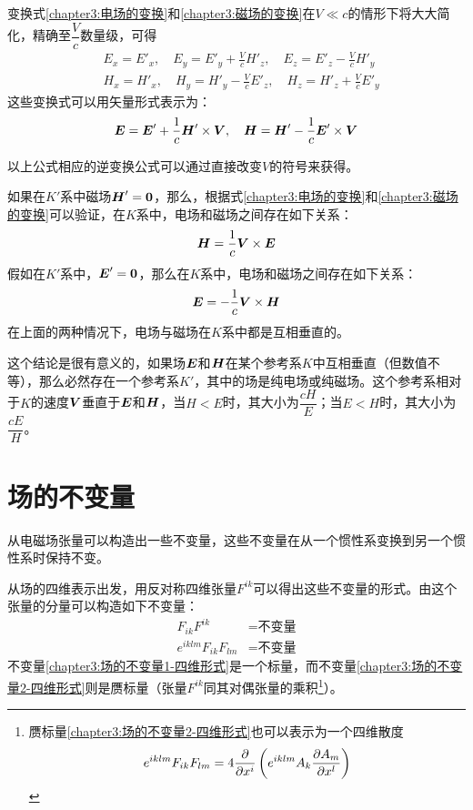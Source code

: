变换式\eqref{chapter3:电场的变换}和\eqref{chapter3:磁场的变换}在$V\ll c$的情形下将大大简化，精确至$\dfrac{V}{c}$数量级，可得
\begin{align*}
	& E_x = E'_x,\quad E_y = E'_y+\frac{V}{c}H'_z,\quad E_z = E'_z-\frac{V}{c}H'_y \\
	& H_x = H'_x,\quad H_y = H'_y-\frac{V}{c}E'_z,\quad H_z = H'_z+\frac{V}{c}E'_y
\end{align*}
这些变换式可以用矢量形式表示为：
\begin{equation}
	\boldsymbol{E} = \boldsymbol{E}'+\frac1c \boldsymbol{H}'\times \boldsymbol{V},\quad \boldsymbol{H} = \boldsymbol{H}'-\frac1c \boldsymbol{E}'\times \boldsymbol{V}
	\label{chapter3:低速近似下的电磁场变换公式}
\end{equation}

以上公式相应的逆变换公式可以通过直接改变$V$的符号来获得。

如果在$K'$系中磁场$\boldsymbol{H}'=\boldsymbol{0}$，那么，根据式\eqref{chapter3:电场的变换}和\eqref{chapter3:磁场的变换}可以验证，在$K$系中，电场和磁场之间存在如下关系：
\begin{equation}
	\boldsymbol{H} = \frac1c\boldsymbol{V}\times \boldsymbol{E}
\end{equation}
假如在$K'$系中，$\boldsymbol{E}'=\boldsymbol{0}$，那么在$K$系中，电场和磁场之间存在如下关系：
\begin{equation}
	\boldsymbol{E} = -\frac1c\boldsymbol{V}\times \boldsymbol{H}
\end{equation}
在上面的两种情况下，电场与磁场在$K$系中都是互相垂直的。

这个结论是很有意义的，如果场$\boldsymbol{E}$和$\boldsymbol{H}$在某个参考系$K$中互相垂直（但数值不等），那么必然存在一个参考系$K'$，其中的场是纯电场或纯磁场。这个参考系相对于$K$的速度$\boldsymbol{V}$垂直于$\boldsymbol{E}$和$\boldsymbol{H}$，当$H<E$时，其大小为$\dfrac{cH}{E}$；当$E<H$时，其大小为$\dfrac{cE}{H}$。

\section{场的不变量}\label{chapter3:section:场的不变量}

从电磁场张量可以构造出一些不变量，这些不变量在从一个惯性系变换到另一个惯性系时保持不变。

从场的四维表示出发，用反对称四维张量$F^{ik}$可以得出这些不变量的形式。由这个张量的分量可以构造如下不变量：
\begin{align}
	F_{ik}F^{ik} & = \text{不变量} \label{chapter3:场的不变量1-四维形式} \\
	e^{iklm}F_{ik}F_{lm} & = \text{不变量} \label{chapter3:场的不变量2-四维形式}
\end{align}
不变量\eqref{chapter3:场的不变量1-四维形式}是一个标量，而不变量\eqref{chapter3:场的不变量2-四维形式}则是赝标量（张量$F^{ik}$同其对偶张量的乘积\footnote{赝标量\eqref{chapter3:场的不变量2-四维形式}也可以表示为一个四维散度
\begin{equation*}
	e^{iklm}F_{ik}F_{lm} = 4\frac{\partial}{\partial x^i}\left(e^{iklm}A_k\frac{\partial A_m}{\partial x^l}\right)
\end{equation*}
}）。

